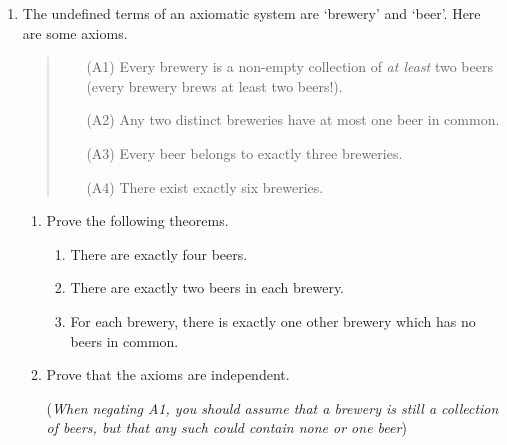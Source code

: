 \begin{exercises}{}{}
\begin{enumerate}
	\item The undefined terms of an axiomatic system are `brewery' and `beer'. Here are some axioms.
  \begin{quote}
	\begin{itemize}%
  	\item[(A1)] Every brewery is a non-empty collection of \emph{at least} two beers (every brewery brews at least two beers!).
  	\item[(A2)] Any two distinct breweries have at most one beer in common.
  	\item[(A3)] Every beer belongs to exactly three breweries.
  	\item[(A4)] There exist exactly six breweries.
	\end{itemize}
  \end{quote}
  \begin{enumerate}%
    \item Prove the following theorems.
    \begin{enumerate}
      \item There are exactly four beers.
      \item There are exactly two beers in each brewery.
      \item For each brewery, there is exactly one other brewery which has no beers in common.
  	\end{enumerate}
  	\item Prove that the axioms are independent.\par
  	(\emph{When negating A1, you should assume that a brewery is still a collection of beers, but that any such could contain none or one beer})
  \end{enumerate}
\end{enumerate}
\end{exercises}